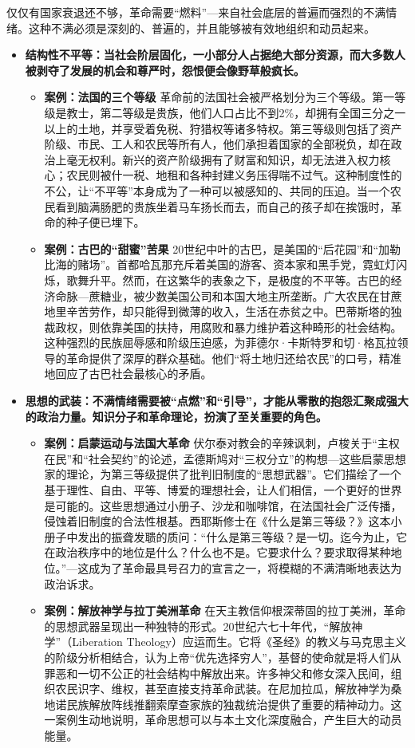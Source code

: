 仅仅有国家衰退还不够，革命需要“燃料”---来自社会底层的普遍而强烈的不满情绪。这种不满必须是深刻的、普遍的，并且能够被有效地组织和动员起来。
\begin{itemize}
\item \textbf{结构性不平等：当社会阶层固化，一小部分人占据绝大部分资源，而大多数人被剥夺了发展的机会和尊严时，怨恨便会像野草般疯长。}
    \begin{itemize}
    \item \textbf{案例：法国的三个等级}
        革命前的法国社会被严格划分为三个等级。第一等级是教士，第二等级是贵族，他们人口占比不到2\%，却拥有全国三分之一以上的土地，并享受着免税、狩猎权等诸多特权。第三等级则包括了资产阶级、市民、工人和农民等所有人，他们承担着国家的全部税负，却在政治上毫无权利。新兴的资产阶级拥有了财富和知识，却无法进入权力核心；农民则被什一税、地租和各种封建义务压得喘不过气。这种制度性的不公，让“不平等”本身成为了一种可以被感知的、共同的压迫。当一个农民看到脑满肠肥的贵族坐着马车扬长而去，而自己的孩子却在挨饿时，革命的种子便已埋下。
    \item \textbf{案例：古巴的“甜蜜”苦果}
        20世纪中叶的古巴，是美国的“后花园”和“加勒比海的赌场”。首都哈瓦那充斥着美国的游客、资本家和黑手党，霓虹灯闪烁，歌舞升平。然而，在这繁华的表象之下，是极度的不平等。古巴的经济命脉---蔗糖业，被少数美国公司和本国大地主所垄断。广大农民在甘蔗地里辛苦劳作，却只能得到微薄的收入，生活在赤贫之中。巴蒂斯塔的独裁政权，则依靠美国的扶持，用腐败和暴力维护着这种畸形的社会结构。这种强烈的民族屈辱感和阶级压迫感，为菲德尔·卡斯特罗和切·格瓦拉领导的革命提供了深厚的群众基础。他们“将土地归还给农民”的口号，精准地回应了古巴社会最核心的矛盾。
    \end{itemize}
\item \textbf{思想的武装：不满情绪需要被“点燃”和“引导”，才能从零散的抱怨汇聚成强大的政治力量。知识分子和革命理论，扮演了至关重要的角色。}
    \begin{itemize}
    \item \textbf{案例：启蒙运动与法国大革命}
        伏尔泰对教会的辛辣讽刺，卢梭关于“主权在民”和“社会契约”的论述，孟德斯鸠对“三权分立”的构想---这些启蒙思想家的理论，为第三等级提供了批判旧制度的“思想武器”。它们描绘了一个基于理性、自由、平等、博爱的理想社会，让人们相信，一个更好的世界是可能的。这些思想通过小册子、沙龙和咖啡馆，在法国社会广泛传播，侵蚀着旧制度的合法性根基。西耶斯修士在《什么是第三等级？》这本小册子中发出的振聋发聩的质问：“什么是第三等级？是一切。迄今为止，它在政治秩序中的地位是什么？什么也不是。它要求什么？要求取得某种地位。”---这成为了革命最具号召力的宣言之一，将模糊的不满清晰地表达为政治诉求。
    \item \textbf{案例：解放神学与拉丁美洲革命}
        在天主教信仰根深蒂固的拉丁美洲，革命的思想武器呈现出一种独特的形式。20世纪六七十年代，“解放神学”（Liberation Theology）应运而生。它将《圣经》的教义与马克思主义的阶级分析相结合，认为上帝“优先选择穷人”，基督的使命就是将人们从罪恶和一切不公正的社会结构中解放出来。许多神父和修女深入民间，组织农民识字、维权，甚至直接支持革命武装。在尼加拉瓜，解放神学为桑地诺民族解放阵线推翻索摩查家族的独裁统治提供了重要的精神动力。这一案例生动地说明，革命思想可以与本土文化深度融合，产生巨大的动员能量。
    \end{itemize}
\end{itemize}

